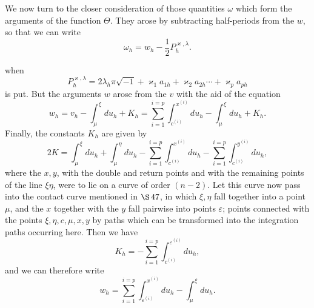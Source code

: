 \documentclass[10pt]{article}
\begin{document}
We now turn to the closer consideration of those quantities \(\omega\) which form the arguments of the function \(\Theta\). They arose by subtracting half-periods from the \(w\), so that we can write
\[
\tag{1}\omega_h=w_h-\frac12P_h^{\varkappa,\lambda}.
\]


when
\[
P_h^{\varkappa,\lambda}=2\lambda_h\pi\sqrt{-1}+\varkappa_1a_{1h}+\varkappa_2a_{2h}\cdots+\varkappa_pa_{ph}
\]
is put. But the arguments \(w\) arose from the \(v\) with the aid of the equation
\[
w_h=v_h-\int_{\mu}^{\xi}du_h+K_h
=\sum_{i=1}^{i=p}\int_{c^{(i)}}^{x^{(i)}}du_h-\int_{\mu}^{\xi}du_h+K_h.
\]
Finally, the constants \(K_h\) are given by
\[
2K=\int_{\mu}^{\xi}du_h+\int_{\mu}^{\eta}du_h
-\sum_{i=1}^{i=p}\int_{c^{(i)}}^{x^{(i)}}du_h
-\sum_{i=1}^{i=p}\int_{c^{(i)}}^{y^{(i)}}du_h,
\]
where the \(x,y\), with the double and return points and with the remaining points of the line \(\xi\eta\), were to lie on a curve of order \((n-2)\). Let this curve now pass into the contact curve mentioned in \(\S\,47\), in which \(\xi,\eta\) fall together into a point \(\mu\), and the \(x\) together with the \(y\) fall pairwise into points \(\varepsilon\); points connected with the points \(\xi,\eta,c,\mu,x,y\) by paths which can be transformed into the integration paths occurring here. Then we have
\[
K_h=-\sum_{i=1}^{i=p}\int_{c^{(i)}}^{\varepsilon^{(i)}}du_h,
\]
and we can therefore write
\[
\tag{2}w_h=\sum_{i=1}^{i=p}\int_{\varepsilon^{(i)}}^{x^{(i)}}du_h-\int_{\mu}^{\xi}du_h.
\]
\end{document}
